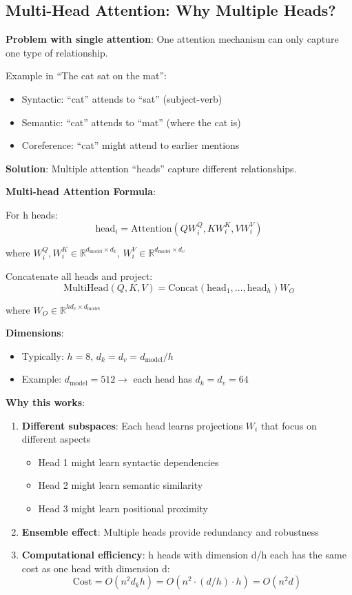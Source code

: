 \subsection{Multi-Head Attention: Why Multiple Heads?}

\textbf{Problem with single attention}: One attention mechanism can only capture one type of relationship.

Example in ``The cat sat on the mat'':
\begin{itemize}
\item Syntactic: ``cat'' attends to ``sat'' (subject-verb)
\item Semantic: ``cat'' attends to ``mat'' (where the cat is)
\item Coreference: ``cat'' might attend to earlier mentions
\end{itemize}

\textbf{Solution}: Multiple attention ``heads'' capture different relationships.

\textbf{Multi-head Attention Formula}:

For h heads:
\[
\text{head}_i = \text{Attention}(QW_i^Q, KW_i^K, VW_i^V)
\]

where $W_i^Q, W_i^K \in \mathbb{R}^{d_{\text{model}} \times d_k}$, $W_i^V \in \mathbb{R}^{d_{\text{model}} \times d_v}$

Concatenate all heads and project:
\[
\text{MultiHead}(Q, K, V) = \text{Concat}(\text{head}_1, ..., \text{head}_h) W_O
\]

where $W_O \in \mathbb{R}^{hd_v \times d_{\text{model}}}$

\textbf{Dimensions}:
\begin{itemize}
\item Typically: $h = 8$, $d_k = d_v = d_{\text{model}} / h$
\item Example: $d_{\text{model}} = 512 \to$ each head has $d_k = d_v = 64$
\end{itemize}

\textbf{Why this works}:

\begin{enumerate}
\item \textbf{Different subspaces}: Each head learns projections $W_i$ that focus on different aspects
\begin{itemize}
\item Head 1 might learn syntactic dependencies
\item Head 2 might learn semantic similarity
\item Head 3 might learn positional proximity
\end{itemize}

\item \textbf{Ensemble effect}: Multiple heads provide redundancy and robustness

\item \textbf{Computational efficiency}: h heads with dimension d/h each has the same cost as one head with dimension d:
\[
\text{Cost} = O(n^2 d_k h) = O(n^2 \cdot (d/h) \cdot h) = O(n^2 d)
\]
\end{enumerate}

